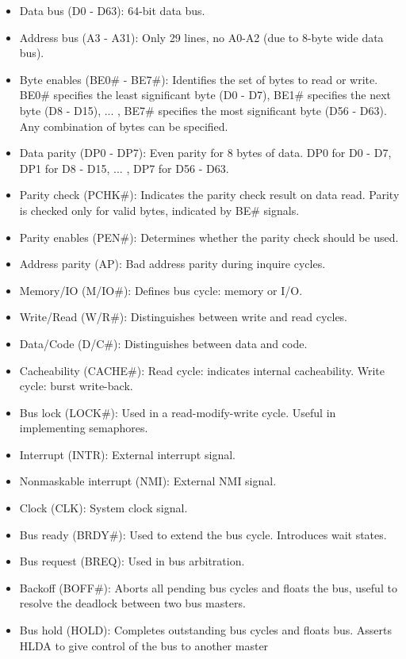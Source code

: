 \documentclass[doc,natbib,12pt]{apa6}
\begin{document}
	\begin{itemize}
		\item Data bus (D0 - D63): 64-bit data bus.
		\item Address bus (A3 - A31): Only 29 lines, no A0-A2 (due to 8-byte wide data bus).
		\item Byte enables (BE0\# - BE7\#): Identifies the set of bytes to read or write. BE0\# specifies the least significant byte (D0 - D7), BE1\# specifies the next byte (D8 - D15), ... , BE7\# specifies the most significant byte (D56 - D63). Any combination of bytes can be specified.
		\item Data parity (DP0 - DP7): Even parity for 8 bytes of data. DP0 for D0 - D7, DP1 for D8 - D15, ... , DP7 for D56 - D63.
		\item Parity check (PCHK\#): Indicates the parity check result on data read. Parity is checked only for valid bytes, indicated by BE\# signals.
		\item Parity enables (PEN\#): Determines whether the parity check should be used.
		\item Address parity (AP): Bad address parity during inquire cycles.
		\item Memory/IO (M/IO\#): Defines bus cycle: memory or I/O.
		\item Write/Read (W/R\#): Distinguishes between write and read cycles.
		\item Data/Code (D/C\#): Distinguishes between data and code.
		\item Cacheability (CACHE\#):  Read cycle: indicates internal cacheability. Write cycle: burst write-back.
		\item Bus lock (LOCK\#): Used in a read-modify-write cycle. Useful in implementing semaphores.
		\item Interrupt (INTR): External interrupt signal.
		\item Nonmaskable interrupt (NMI): External NMI signal.
		\item Clock (CLK): System clock signal.
		\item Bus ready (BRDY\#): Used to extend the bus cycle. Introduces wait states.
		\item Bus request (BREQ): Used in bus arbitration.
		\item Backoff (BOFF\#): Aborts all pending bus cycles and floats the bus, useful to resolve the deadlock between two bus masters.
		\item Bus hold (HOLD): Completes outstanding bus cycles and floats bus. Asserts HLDA to give control of the bus to another master

\end{itemize}
\end{document}
